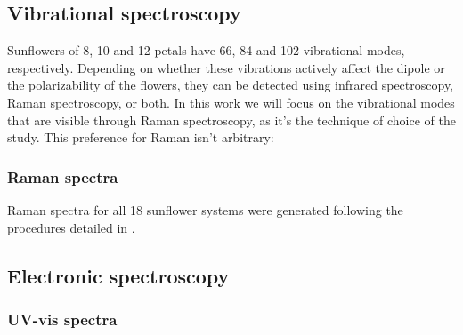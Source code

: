 \subsection{Vibrational spectroscopy}
Sunflowers of 8, 10 and 12 petals have 66, 84 and 102 vibrational modes, respectively.
Depending on whether these vibrations actively affect the dipole or the polarizability of the flowers, they can be detected using infrared spectroscopy, Raman spectroscopy, or both.
In this work we will focus on the vibrational modes that are visible through Raman spectroscopy, as it's the technique of choice of the study.
This preference for Raman isn't arbitrary: 

\subsubsection{Raman spectra}
Raman spectra for all 18 sunflower systems were generated following the procedures detailed in .


\subsection{Electronic spectroscopy}
\blindtext
\subsubsection{UV-vis spectra}
\blindtext[4]
